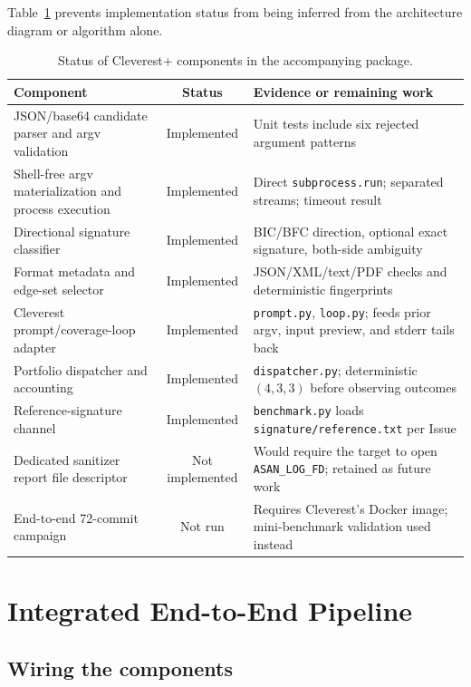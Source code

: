 \documentclass{article}
\begin{document}
Table~\ref{tab:status} prevents implementation status from being inferred from
the architecture diagram or algorithm alone.

\begin{table}[H]
\centering
\caption{Status of Cleverest+ components in the accompanying package.}
\label{tab:status}
\small
\begin{tabularx}{\textwidth}{X c X}
\toprule
Component & Status & Evidence or remaining work \\
\midrule
JSON/base64 candidate parser and argv validation & Implemented & Unit tests include six rejected argument patterns \\
Shell-free argv materialization and process execution & Implemented & Direct \texttt{subprocess.run}; separated streams; timeout result \\
Directional signature classifier & Implemented & BIC/BFC direction, optional exact signature, both-side ambiguity \\
Format metadata and edge-set selector & Implemented & JSON/XML/text/PDF checks and deterministic fingerprints \\
Cleverest prompt/coverage-loop adapter & Implemented & \texttt{prompt.py}, \texttt{loop.py}; feeds prior argv, input preview, and stderr tails back \\
Portfolio dispatcher and accounting & Implemented & \texttt{dispatcher.py}; deterministic $(4,3,3)$ before observing outcomes \\
Reference-signature channel & Implemented & \texttt{benchmark.py} loads \texttt{signature/reference.txt} per Issue \\
Dedicated sanitizer report file descriptor & Not implemented & Would require the target to open \texttt{ASAN\_LOG\_FD}; retained as future work \\
End-to-end 72-commit campaign & Not run & Requires Cleverest's Docker image; mini-benchmark validation used instead \\
\bottomrule
\end{tabularx}
\end{table}

\section{Integrated End-to-End Pipeline}
\label{sec:integrated}

\subsection{Wiring the components}
\end{document}
